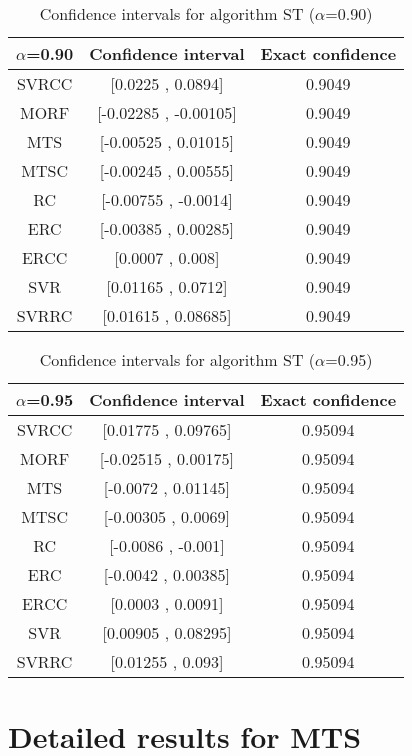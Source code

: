 \documentclass[a4paper,10pt]{article}
\begin{document}
\begin{table}[!htp]
\centering\small
\begin{tabular}{
|c|c|c|}
\hline
 $\alpha$=0.90 & Confidence interval & Exact confidence \\ \hline 
SVRCC & [0.0225 , 0.0894] & 0.9049\\ \hline 
MORF & [-0.02285 , -0.00105] & 0.9049\\ \hline 
MTS & [-0.00525 , 0.01015] & 0.9049\\ \hline 
MTSC & [-0.00245 , 0.00555] & 0.9049\\ \hline 
RC & [-0.00755 , -0.0014] & 0.9049\\ \hline 
ERC & [-0.00385 , 0.00285] & 0.9049\\ \hline 
ERCC & [0.0007 , 0.008] & 0.9049\\ \hline 
SVR & [0.01165 , 0.0712] & 0.9049\\ \hline 
SVRRC & [0.01615 , 0.08685] & 0.9049\\ \hline 

\end{tabular}
\caption{Confidence intervals for algorithm ST ($\alpha$=0.90)}
\end{table}
\begin{table}[!htp]
\centering\small
\begin{tabular}{
|c|c|c|}
\hline
 $\alpha$=0.95 & Confidence interval & Exact confidence \\ \hline 
SVRCC & [0.01775 , 0.09765] & 0.95094\\ \hline 
MORF & [-0.02515 , 0.00175] & 0.95094\\ \hline 
MTS & [-0.0072 , 0.01145] & 0.95094\\ \hline 
MTSC & [-0.00305 , 0.0069] & 0.95094\\ \hline 
RC & [-0.0086 , -0.001] & 0.95094\\ \hline 
ERC & [-0.0042 , 0.00385] & 0.95094\\ \hline 
ERCC & [0.0003 , 0.0091] & 0.95094\\ \hline 
SVR & [0.00905 , 0.08295] & 0.95094\\ \hline 
SVRRC & [0.01255 , 0.093] & 0.95094\\ \hline 

\end{tabular}
\caption{Confidence intervals for algorithm ST ($\alpha$=0.95)}
\end{table}

 \clearpage 


\section{Detailed results for MTS}
\end{document}
